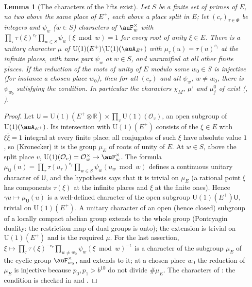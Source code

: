 \documentclass[10pt]{amsart}
\newtheorem{lemma}[theorem]{Lemma}
\theoremstyle{definition}
\theoremstyle{remark}
\newcommand{\R}{\mathbb R}
\providecommand{\auO}{\mathcal O}
\providecommand{\auPl}{\Phi}
\providecommand{\auU}{\mathrm U}
\providecommand{\aubar}[1]{\overline{#1}}
\begin{document}
\begin{lemma}[The characters of the lifts exist]\label{pz:mu}
Let $S$ be a finite set of primes of $E$, no two above the same place of $E^+$, each above a place
split in $E$; let $(c_\tau)_{\tau\in\auPl}$ be integers and $\psi_w$ ($w\in S$) characters of
$\auF_w^\times$ with $\prod_\tau\tau(\xi)^{c_\tau}\prod_{w\in S}\psi_w(\xi\bmod w)=1$ for every root of
unity $\xi\in E$. There is a unitary character $\mu$ of $\auU(1)(E^+)\backslash\auU(1)(\auA_{E^+})$ with
$\mu_\tau(u)=\tau(u)^{c_\tau}$ at the infinite places, with tame part $\psi_w$ at $w\in S$, and
unramified at all other finite places. If the reduction of the roots of unity of $E$ modulo some
$w_0\in S$ is injective (for instance a chosen place $w_0$), then for all $(c_\tau)$ and all $\psi_w$,
$w\ne w_0$, there is $\psi_{w_0}$ satisfying the condition. In particular the characters $\chi_M$,
$\mu^\flat$ and $\mu_j^0$ of {\cite[\S14.3]{P46}} exist ({\cite[Definition~6.14]{P54}},
{\cite[Proposition~6.15]{P54}}).
\end{lemma}
\begin{proof}
Let $\mathsf U=\auU(1)(E^+\otimes\R)\times\prod_v\auU(1)(\auO_v)$, an open subgroup of
$\auU(1)(\auA_{E^+})$. Its intersection with $\auU(1)(E^+)$ consists of the $\xi\in E$ with
$\xi\aubar\xi=1$ integral at every finite place; all conjugates of such $\xi$ have absolute value
$1$, so (Kronecker) it is the group $\mu_E$ of roots of unity of $E$. At $w\in S$, above the split
place $v$, $\auU(1)(\auO_v)=\auO_w^\times\to\auF_w^\times$. The formula
$\mu_{\mathsf U}(u)=\prod_\tau\tau(u_\tau)^{c_\tau}\prod_{w\in S}\psi_w(u_w\bmod w)$ defines a continuous
unitary character of $\mathsf U$, and the hypothesis says that it is trivial on $\mu_E$ (a rational
point $\xi$ has components $\tau(\xi)$ at the infinite places and $\xi$ at the finite ones). Hence
$\gamma u\mapsto\mu_{\mathsf U}(u)$ is a well-defined character of the open subgroup
$\auU(1)(E^+)\mathsf U$, trivial on $\auU(1)(E^+)$. A unitary character of an open (hence closed)
subgroup of a locally compact abelian group extends to the whole group (Pontryagin duality: the
restriction map of dual groups is onto); the extension is trivial on $\auU(1)(E^+)$ and is the
required $\mu$. For the last assertion, $\xi\mapsto\prod_\tau\tau(\xi)^{-c_\tau}\prod_{w\ne
w_0}\psi_w(\xi\bmod w)^{-1}$ is a character of the subgroup $\mu_E$ of the cyclic group
$\auF_{w_0}^\times$, and extends to it; at a chosen place $w_0$ the reduction of $\mu_E$ is injective
because $p_0,p_1>b^{10}$ do not divide $\#\mu_E$. The characters of {\cite[\S14.3]{P46}}: the
condition is checked in {\cite[Definition~6.14]{P54}} and {\cite[Proposition~6.15(T1)]{P54}}.
\end{proof}
\end{document}
